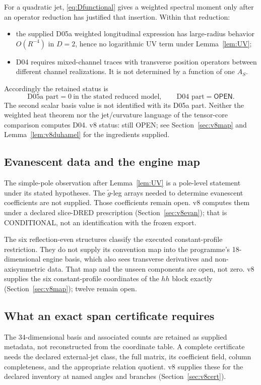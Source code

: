 \documentclass[11pt,a4paper]{article}
\newcommand{\OPEN}{\textsf{OPEN}}
\newcommand{\CONDITIONAL}{\textsf{CONDITIONAL}}
\theoremstyle{plain}
\theoremstyle{definition}
\theoremstyle{remark}
\numberwithin{equation}{section}
\begin{document}
For a quadratic jet, \eqref{eq:Dfunctional} gives a weighted
spectral moment only after an operator reduction has justified
that insertion.
Within that reduction:
\begin{itemize}
\item the supplied D05a weighted longitudinal expression has
large-radius behavior \(O(R^{-4})\) in \(D=2\), hence no
logarithmic UV term under Lemma~\ref{lem:UV};
\item D04 requires mixed-channel traces with transverse position
operators between different channel realizations. It is not
determined by a function of one \(A_S\).
\end{itemize}
Accordingly the retained status is
\[
 \text{D05a part}=0\ \text{in the stated reduced model},
 \qquad
 \text{D04 part}=\OPEN.
\]
The second scalar basis value is not identified with its D05a
part. Neither the weighted heat theorem nor the jet/curvature
language of the tensor-core comparison computes D04.
v8 status: still \OPEN; see Section~\ref{sec:v8map} and
Lemma~\ref{lem:v8duhamel} for the ingredients supplied.

\subsection{Evanescent data and the engine map}

The simple-pole observation after Lemma~\ref{lem:UV} is a
pole-level statement under its stated hypotheses.
The \(\tilde g\)-leg arrays needed to determine evanescent
coefficients are not supplied. Those coefficients remain open.
v8 computes them under a declared slice-DRED prescription
(Section~\ref{sec:v8evan}); that is \CONDITIONAL, not an identification
with the frozen export.

The six reflection-even structures classify the executed
constant-profile restriction. They do not supply its convention
map into the programme's 18-dimensional engine basis, which also
sees transverse derivatives and non-axisymmetric data.
That map and the unseen components are open, not zero.
v8 supplies the six constant-profile coordinates of the \(hh\) block
exactly (Section~\ref{sec:v8map}); twelve remain open.

\subsection{What an exact span certificate requires}

The 34-dimensional basis and associated counts are retained as
supplied metadata, not reconstructed from the coordinate table.
A complete certificate needs the declared external-jet class,
the full matrix, its coefficient field, column completeness,
and the appropriate relation quotient.
v8 supplies these for the declared inventory at named angles and
branches (Section~\ref{sec:v8cert}).
\end{document}
